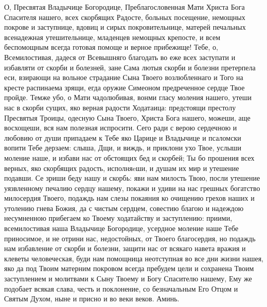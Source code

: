 О, Пресвятая Владычице Богородице, Преблагословенная Мати Христа Бога Спасителя нашего, всех скорбящих Радосте, больных посещение, немощных покрове и заступнице, вдовиц и сирых покровительнице, матерей печальных всенадежная утешительнице, младенцев немощных крепосте, и всем беспомощным всегда готовая помоще и верное прибежище! Тебе, о, Всемилостивая, дадеся от Всевышняго благодать во еже всех заступати и избавляти от скорби и болезней, зане Сама лютыя скорби и болезни претерпела еси, взирающи на вольное страдание Сына Твоего возлюбленнаго и Того на кресте распинаема зрящи, егда оружие Симеоном предреченное сердце Твое пройде. Темже убо, о Мати чадолюбивая, вонми гласу моления нашего, утеши нас в скорби сущих, яко верная радости Ходатаица: предстоящи престолу Пресвятыя Троицы, одесную Сына Твоего, Христа Бога нашего, можеши, аще восхощеши, вся нам полезная испросити. Сего ради с верою сердечною и любовию от души припадаем к Тебе яко Царице и Владычице и псаломски вопити Тебе дерзаем: слыша, Дщи, и виждь, и приклони ухо Твое, услыши моление наше, и избави нас от обстоящих бед и скорбей; Ты бо прошения всех верных, яко скорбящих радость, исполняeши, и душам их мир и утешение подавши. Се зриши беду нашу и скорбь: яви нам милость Твою, посли утешение уязвленному печалию сердцу нашему, покажи и удиви на нас грешных богатство милосердия Твоего, подаждь нам слезы покаяния ко очищению грехов наших и утолению гнева Божия, да с чистым сердцем, совестию благою и надеждою несумненною прибегаем ко Твоему ходатайству и заступлению: приими, всемилостивая наша Владычице Богородице, усердное моление наше Тебе приносимое, и не отрини нас, недостойных, от Твоего благосердия, но подаждь нам избавление от скорби и болезни, защити нас от всякаго навета вражия и клеветы человеческая, буди нам помощница неотступная во все дни жизни нашея, яко да под Твоим матерним покровом всегда пребудем цели и сохранена Твоим заступлением и молитвами к Сыну Твоему и Богу Спасителю нашему, Ему же подобает всякая слава, честь и поклонение, со безначальным Его Отцом и Святым Духом, ныне и присно и во веки веков. Аминь.
\mychapterending

 


